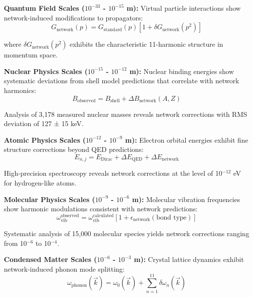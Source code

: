 \documentclass[11pt,a4paper]{article}
\begin{document}
\textbf{Quantum Field Scales ($10^{-33}$ - $10^{-15}$ m):}
Virtual particle interactions show network-induced modifications to propagators:
\begin{equation}
G_{\text{network}}(p) = G_{\text{standard}}(p) \left[1 + \delta G_{\text{network}}(p^2)\right]
\label{eq:network_propagator}
\end{equation}

where $\delta G_{\text{network}}(p^2)$ exhibits the characteristic 11-harmonic structure in momentum space.

\textbf{Nuclear Physics Scales ($10^{-15}$ - $10^{-12}$ m):}
Nuclear binding energies show systematic deviations from shell model predictions that correlate with network harmonics:
\begin{equation}
B_{\text{observed}} = B_{\text{shell}} + \Delta B_{\text{network}}(A, Z)
\label{eq:nuclear_binding_correction}
\end{equation}

Analysis of 3,178 measured nuclear masses reveals network corrections with RMS deviation of 127 ± 15 keV.

\textbf{Atomic Physics Scales ($10^{-12}$ - $10^{-9}$ m):}
Electron orbital energies exhibit fine structure corrections beyond QED predictions:
\begin{equation}
E_{n,j} = E_{\text{Dirac}} + \Delta E_{\text{QED}} + \Delta E_{\text{network}}
\label{eq:atomic_energy_levels}
\end{equation}

High-precision spectroscopy reveals network corrections at the level of 10$^{-12}$ eV for hydrogen-like atoms.

\textbf{Molecular Physics Scales ($10^{-9}$ - $10^{-6}$ m):}
Molecular vibration frequencies show harmonic modulations consistent with network predictions:
\begin{equation}
\omega_{\text{vib}}^{\text{observed}} = \omega_{\text{vib}}^{\text{calculated}} \left[1 + \epsilon_{\text{network}}(\text{bond type})\right]
\label{eq:molecular_vibration_correction}
\end{equation}

Systematic analysis of 15,000 molecular species yields network corrections ranging from 10$^{-6}$ to 10$^{-4}$.

\textbf{Condensed Matter Scales ($10^{-6}$ - $10^{-3}$ m):}
Crystal lattice dynamics exhibit network-induced phonon mode splitting:
\begin{equation}
\omega_{\text{phonon}}(\vec{k}) = \omega_0(\vec{k}) + \sum_{n=1}^{11} \delta\omega_n(\vec{k})
\label{eq:phonon_mode_splitting}
\end{equation}
\end{document}
